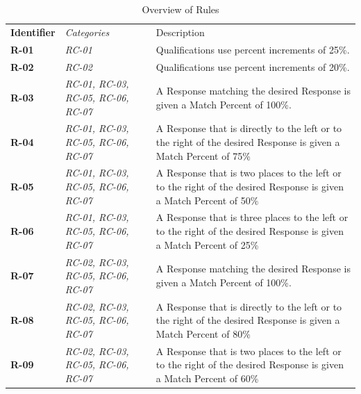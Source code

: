 \documentclass[12pt,letterpaper]{article}
\begin{document}
\begin{table}[H]
	\caption{Overview of Rules}
	\begin{tabu} to 
	    \tableheader{}Identifier & Categories & Description\\
		R-01 & RC-01 & Qualifications use percent increments of 25\%.\\
		R-02 & RC-02 & Qualifications use percent increments of 20\%.\\
		R-03 & RC-01, RC-03, RC-05, RC-06, RC-07 & A Response matching the desired Response is given a Match Percent of 100\%.\\
		R-04 & RC-01, RC-03, RC-05, RC-06, RC-07 & A Response that is directly to the left or to the right of the desired Response is given a Match Percent of 75\%\\
		R-05 & RC-01, RC-03, RC-05, RC-06, RC-07 & A Response that is two places to the left or to the right of the desired Response is given a Match Percent of 50\%\\
		R-06 & RC-01, RC-03, RC-05, RC-06, RC-07 & A Response that is three places to the left or to the right of the desired Response is given a Match Percent of 25\%\\
		R-07 & RC-02, RC-03, RC-05, RC-06, RC-07 & A Response matching the desired Response is given a Match Percent of 100\%.\\
		R-08 & RC-02, RC-03, RC-05, RC-06, RC-07 & A Response that is directly to the left or to the right of the desired Response is given a Match Percent of 80\%\\
		R-09 & RC-02, RC-03, RC-05, RC-06, RC-07 & A Response that is two places to the left or to the right of the desired Response is given a Match Percent of 60\%\\
	\end{tabu}
\end{table}
\end{document}
